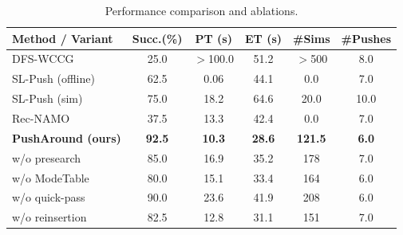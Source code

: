 \begin{table}[t]
  \centering
  \begin{threeparttable}
  \caption{Performance comparison and ablations.}
  \label{tab:main_ablation}
  \vspace{2pt}
  \setlength{\tabcolsep}{2.5pt}
  \renewcommand{\arraystretch}{0.95}
  \begin{tabular}{lccccc}
  \toprule
  Method / Variant & Succ.(\%) & PT (s) & ET (s) & \#Sims & \#Pushes \\
  \midrule
   DFS-WCCG             & 25.0  & $>$100.0  & 51.2     & $>$500    & 8.0   \\
  SL-Push (offline)   & 62.5  & 0.06  & 44.1   & 0.0   & 7.0  \\
  SL-Push (sim)        & 75.0  & 18.2  & 64.6   & 20.0 & 10.0  \\
  Rec-NAMO             & 37.5  & 13.3  & 42.4   & 0.0   & 7.0  \\
  \textbf{PushAround (ours)} & \textbf{92.5} & \textbf{10.3} & \textbf{28.6} & \textbf{121.5} & \textbf{6.0} \\
  \midrule
  w/o presearch        & 85.0 & 16.9 & 35.2 & 178 & 7.0 \\
  w/o ModeTable        & 80.0 & 15.1 & 33.4  & 164 & 6.0 \\
  w/o quick-pass       & 90.0 & 23.6 & 41.9  & 208 & 6.0 \\
  w/o reinsertion      & 82.5 & 12.8 & 31.1  & 151 & 7.0 \\
  \bottomrule
  \end{tabular}
  \end{threeparttable}
  \vspace{-4mm}
\end{table}


